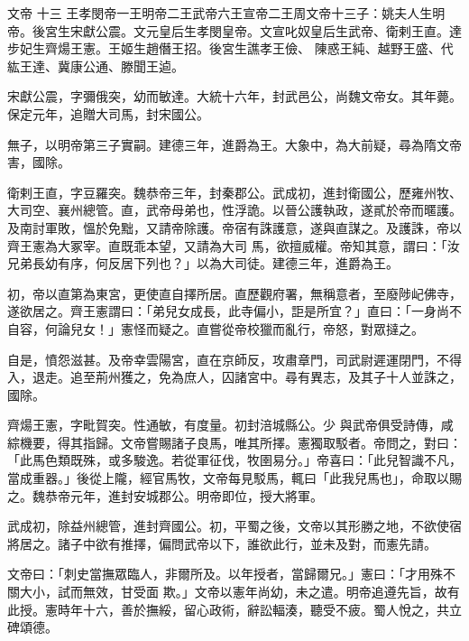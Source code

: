 
\begin{pinyinscope}

 文帝
 十三
 王孝閔帝一王明帝二王武帝六王宣帝二王周文帝十三子：姚夫人生明帝。後宮生宋獻公震。文元皇后生孝閔皇帝。文宣叱奴皇后生武帝、衛剌王直。達步妃生齊煬王憲。王姬生趙僭王招。後宮生譙孝王儉、
 陳惑王純、越野王盛、代紘王達、冀康公通、滕聞王逌。



 宋獻公震，字彌俄突，幼而敏達。大統十六年，封武邑公，尚魏文帝女。其年薨。保定元年，追贈大司馬，封宋國公。



 無子，以明帝第三子實嗣。建德三年，進爵為王。大象中，為大前疑，尋為隋文帝害，國除。



 衛剌王直，字豆羅突。魏恭帝三年，封秦郡公。武成初，進封衛國公，歷雍州牧、大司空、襄州總管。直，武帝母弟也，性浮詭。以晉公護執政，遂貳於帝而暱護。及南討軍敗，慍於免黜，又請帝除護。帝宿有誅護意，遂與直謀之。及護誅，帝以齊王憲為大冢宰。直既乖本望，又請為大司
 馬，欲擅威權。帝知其意，謂曰：「汝兄弟長幼有序，何反居下列也？」以為大司徒。建德三年，進爵為王。



 初，帝以直第為東宮，更使直自擇所居。直歷觀府署，無稱意者，至廢陟屺佛寺，遂欲居之。齊王憲謂曰：「弟兒女成長，此寺偏小，詎是所宜？」直曰：「一身尚不自容，何論兒女！」憲怪而疑之。直嘗從帝校獵而亂行，帝怒，對眾撻之。



 自是，憤怨滋甚。及帝幸雲陽宮，直在京師反，攻肅章門，司武尉遲運閉門，不得入，退走。追至荊州獲之，免為庶人，囚諸宮中。尋有異志，及其子十人並誅之，國除。



 齊煬王憲，字毗賀突。性通敏，有度量。初封涪城縣公。少
 與武帝俱受詩傳，咸綜機要，得其指歸。文帝嘗賜諸子良馬，唯其所擇。憲獨取駁者。帝問之，對曰：「此馬色類既殊，或多駿逸。若從軍征伐，牧圉易分。」帝喜曰：「此兒智識不凡，當成重器。」後從上隴，經官馬牧，文帝每見駁馬，輒曰「此我兒馬也」，命取以賜之。魏恭帝元年，進封安城郡公。明帝即位，授大將軍。



 武成初，除益州總管，進封齊國公。初，平蜀之後，文帝以其形勝之地，不欲使宿將居之。諸子中欲有推擇，偏問武帝以下，誰欲此行，並未及對，而憲先請。



 文帝曰：「刺史當撫眾臨人，非爾所及。以年授者，當歸爾兄。」憲曰：「才用殊不關大小，試而無效，甘受面
 欺。」文帝以憲年尚幼，未之遣。明帝追遵先旨，故有此授。憲時年十六，善於撫綏，留心政術，辭訟輻湊，聽受不疲。蜀人悅之，共立碑頌德。




\end{pinyinscope}
